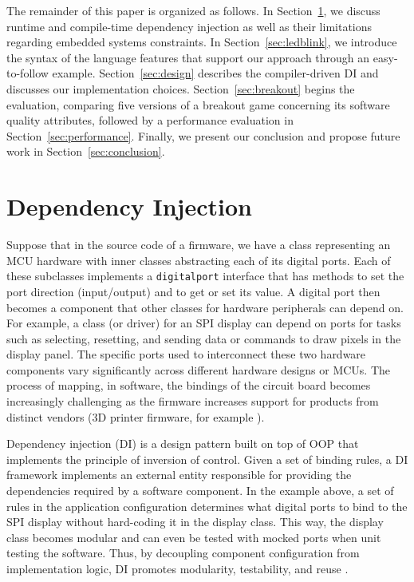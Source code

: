 \documentclass[10pt,sigplan,screen,anonymous]{acmart}
\begin{document}
The remainder of this paper is organized as follows. In Section~\ref{sec:di}, we discuss runtime and compile-time dependency injection as well as their limitations regarding embedded systems constraints. In Section~\ref{sec:ledblink}, we introduce the syntax of the language features that support our approach through an easy-to-follow example. Section~\ref{sec:design} describes the compiler-driven DI and discusses our implementation choices. Section~\ref{sec:breakout} begins the evaluation, comparing five versions of a breakout game concerning its software quality attributes, followed by a performance evaluation in Section~\ref{sec:performance}. Finally, we present our conclusion and propose future work in Section~\ref{sec:conclusion}.


\section{Dependency Injection} \label{sec:di}
 
Suppose that in the source code of a firmware, we have a class representing an MCU hardware with inner classes abstracting each of its digital ports. Each of these subclasses implements a {\tt digitalport} interface that has methods to set the port direction (input/output) and to get or set its value. A digital port then becomes a component that other classes for hardware peripherals can depend on. For example, a class (or driver) for an SPI display can depend on ports for tasks such as selecting, resetting, and sending data or commands to draw pixels in the display panel. The specific ports used to interconnect these two hardware components vary significantly across different hardware designs or MCUs. The process of mapping, in software, the bindings of the circuit board becomes increasingly challenging as the firmware increases support for products from distinct vendors (3D printer firmware, for example \cite{marlinfwm2025}).
 
Dependency injection (DI) \cite{seemann2019dependency} is a design pattern built on top of OOP that implements the principle of inversion of control. Given a set of binding rules, a DI framework implements an external entity responsible for providing the dependencies required by a software component. In the example above, a set of rules in the application configuration determines what digital ports to bind to the SPI display without hard-coding it in the display class. This way, the display class becomes modular and can even be tested with mocked ports when unit testing the software. Thus, by decoupling component configuration from implementation logic, DI promotes modularity, testability, and reuse \cite{seemann2019dependency,garousi2019}.
\end{document}

